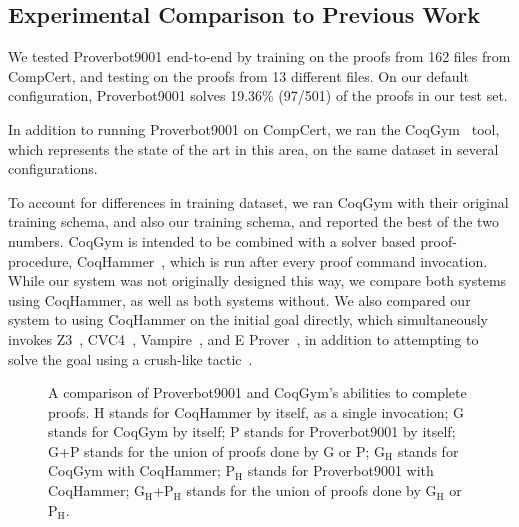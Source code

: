 \documentclass[sigplan,screen]{acmart}
\newcommand{\name}{Proverbot9001\xspace}
\renewcommand{\>}{\quad}
\begin{document}
\subsection{Experimental Comparison to Previous Work}
\label{ssec:coqgym-comparison}

We tested \name{} end-to-end by training on the proofs from 162 files from CompCert,
  and testing on the proofs from 13 different files.
On our default configuration,
  \name{} solves 19.36\% (97/501) of the proofs in our test set.

In addition to running \name{} on CompCert,
  we ran the CoqGym~\cite{coqgym} tool,
  which represents the state of the art in this area,
  on the same dataset in several configurations.

To account for differences in training dataset,
  we ran CoqGym with their original training schema,
  and also our training schema,
  and reported the best of the two numbers.
CoqGym is intended to be combined with a solver based proof-procedure,
  CoqHammer~\cite{coqhammer}, which is run after every proof command invocation.
While our system was not originally designed this way,
  we compare both systems using CoqHammer,
  as well as both systems without.
We also compared our system to using CoqHammer on the initial goal directly,
  which simultaneously invokes Z3~\cite{z3}, CVC4~\cite{cvc4},
  Vampire~\cite{vampire}, and E Prover~\cite{eprover},
  in addition to attempting to solve the goal using a crush-like tactic~\cite{Chlipala}.

\begin{figure}
\caption{A comparison of Proverbot9001 and CoqGym's abilities to
  complete proofs.
H stands for CoqHammer by itself, as a single invocation;
G stands for CoqGym by itself;
P stands for \name{} by itself;
G+P stands for the union of proofs done by G or P;
$\text{G}_\text{H}$ stands for CoqGym with CoqHammer;
$\text{P}_\text{H}$ stands for Proverbot9001 with CoqHammer;
$\text{G}_\text{H}$+$\text{P}_\text{H}$ stands for the union of proofs done by $\text{G}_\text{H}$ or $\text{P}_\text{H}$.}
\label{fig:proofs-solved-bars}
\end{figure}
\end{document}
